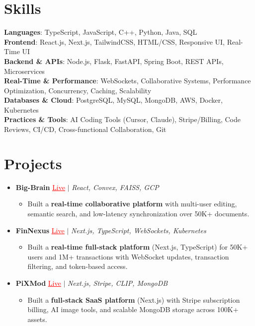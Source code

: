 \documentclass[letterpaper,10pt]{article}
\newcommand{\resumeItem}[1]{\item\small{{#1 \vspace{-2pt}}}}
\newcommand{\resumeProjectHeading}[1]{\item \small #1 \vspace{-2pt}}
\newcommand{\resumeSubHeadingListStart}{\begin{itemize}[leftmargin=0.0in, label={}]}
\newcommand{\resumeSubHeadingListEnd}{\end{itemize}}
\newcommand{\resumeProjItemListStart}{\begin{itemize}[leftmargin=0.15in,label=\textbullet,itemsep=0pt,topsep=0pt,parsep=0pt,partopsep=0pt]}
\newcommand{\resumeProjItemListEnd}{\end{itemize}\vspace{-4pt}}
\begin{document}
\section{Skills}
\begin{itemize}[leftmargin=0.15in, label={}]
\small{\item{
\textbf{Languages}: TypeScript, JavaScript, C++, Python, Java, SQL \\
\textbf{Frontend}: React.js, Next.js, TailwindCSS, HTML/CSS, Responsive UI, Real-Time UI \\
\textbf{Backend \& APIs}: Node.js, Flask, FastAPI, Spring Boot, REST APIs, Microservices \\
\textbf{Real-Time \& Performance}: WebSockets, Collaborative Systems, Performance Optimization, Concurrency, Caching, Scalability \\
\textbf{Databases \& Cloud}: PostgreSQL, MySQL, MongoDB, AWS, Docker, Kubernetes \\
\textbf{Practices \& Tools}: AI Coding Tools (Cursor, Claude), Stripe/Billing, Code Reviews, CI/CD, Cross-functional Collaboration, Git
}}
\end{itemize}
\vspace{-6pt}
\section{Projects}
\resumeSubHeadingListStart
\vspace{-2pt}
\resumeProjectHeading{\textbf{Big-Brain} {\href{https://big-brain-pied.vercel.app/}{\textcolor{red}{\underline{Live}}}} $|$ \emph{React, Convex, FAISS, GCP}}
\resumeProjItemListStart
\resumeItem{Built a \textbf{real-time collaborative platform} with multi-user editing, semantic search, and low-latency synchronization over 50K+ documents.}
\resumeProjItemListEnd
\vspace{3pt}
\resumeProjectHeading{\textbf{FinNexus} {\href{https://fin-nexus.vercel.app/}{\textcolor{red}{\underline{Live}}}} $|$ \emph{Next.js, TypeScript, WebSockets, Kubernetes}}
\resumeProjItemListStart
\resumeItem{Built a \textbf{real-time full-stack platform} (Next.js, TypeScript) for 50K+ users and 1M+ transactions with WebSocket updates, transaction filtering, and token-based access.}
\resumeProjItemListEnd
\vspace{3pt}
\resumeProjectHeading{\textbf{PiXMod} {\href{https://pixmod.vercel.app/}{\textcolor{red}{\underline{Live}}}} $|$ \emph{Next.js, Stripe, CLIP, MongoDB}}
\resumeProjItemListStart
\resumeItem{Built a \textbf{full-stack SaaS platform} (Next.js) with Stripe subscription billing, AI image tools, and scalable MongoDB storage across 100K+ assets.}
\resumeProjItemListEnd
\resumeSubHeadingListEnd
\end{document}
